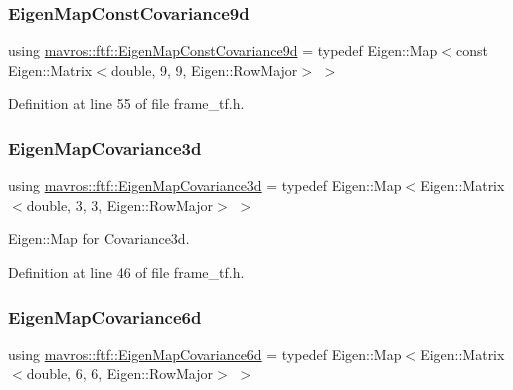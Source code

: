 \mbox{\label{group__nodelib_ga74be5c2cc6a60a7c17ab1286a1106643}} 
\subsubsection{\texorpdfstring{EigenMapConstCovariance9d}{EigenMapConstCovariance9d}}
{\footnotesize\ttfamily using \mbox{\hyperlink{group__nodelib_ga74be5c2cc6a60a7c17ab1286a1106643}{mavros\+::ftf\+::\+Eigen\+Map\+Const\+Covariance9d}} = typedef Eigen\+::\+Map$<$const Eigen\+::\+Matrix$<$double, 9, 9, Eigen\+::\+Row\+Major$>$ $>$}



Definition at line 55 of file frame\+\_\+tf.\+h.

\mbox{\label{group__nodelib_gabafbfa3aa489d1c304f320a417ce91d1}} 
\subsubsection{\texorpdfstring{EigenMapCovariance3d}{EigenMapCovariance3d}}
{\footnotesize\ttfamily using \mbox{\hyperlink{group__nodelib_gabafbfa3aa489d1c304f320a417ce91d1}{mavros\+::ftf\+::\+Eigen\+Map\+Covariance3d}} = typedef Eigen\+::\+Map$<$Eigen\+::\+Matrix$<$double, 3, 3, Eigen\+::\+Row\+Major$>$ $>$}



Eigen\+::\+Map for Covariance3d. 



Definition at line 46 of file frame\+\_\+tf.\+h.

\mbox{\label{group__nodelib_ga5d26d0ee661868a02a4fd476856757e3}} 
\subsubsection{\texorpdfstring{EigenMapCovariance6d}{EigenMapCovariance6d}}
{\footnotesize\ttfamily using \mbox{\hyperlink{group__nodelib_ga5d26d0ee661868a02a4fd476856757e3}{mavros\+::ftf\+::\+Eigen\+Map\+Covariance6d}} = typedef Eigen\+::\+Map$<$Eigen\+::\+Matrix$<$double, 6, 6, Eigen\+::\+Row\+Major$>$ $>$}



